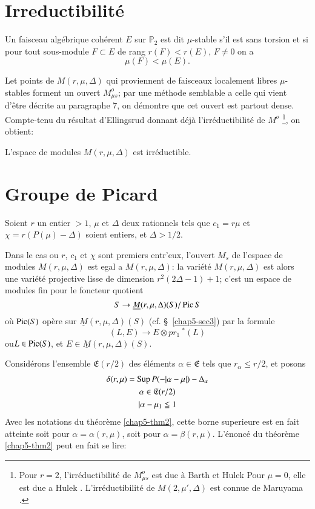 \section{Irreductibilit\'e}\label{chap5-sec8}

Un faisceau alg\'ebrique coh\'erent $E$ sur $\mathbb{P}_{2}$ est dit
$\mu$-stable s'il est sans torsion et si pour tout sous-module
$F\subset E$ de rang $r(F)<r(E)$, $F\neq 0$ on a 
$$
\mu(F)<\mu(E).
$$\pageoriginale

Let points de $M(r,\mu,\Delta)$ qui proviennent de faisceaux
localement libres $\mu$-stables forment un ouvert $M^{o}_{\mu s}$; par
une m\'ethode semblable a celle qui vient d'\^etre d\'ecrite au
paragraphe 7, on d\'emontre que cet ouvert est partout
dense. Compte-tenu du r\'esultat d'Ellingsrud donnant d\'ej\`a
l'irr\'eductibilit\'e de $M^{o}$ \cite{chap5-key6}\footnote[1]{Pour
$r=2$, l'irr\'eductibilit\'e de $M^{o}_{\mu s}$ est due \`a
Barth \cite{chap5-key2} et Hulek \cite{chap5-key9} Pour $\mu=0$, elle
est due a Hulek \cite{chap5-key10}. L'irr\'eductibilit\'e de
$M(2,\mu',\Delta)$ est connue de Maruyama \cite{chap5-key12}.}, on
obtient: 

\begin{theorem}\label{chap5-thm4}
L'espace de modules $M(r,\mu,\Delta)$ est irr\'eductible. 
\end{theorem}

\section{Groupe de Picard}\label{chap5-sec9}

Soient $r$ un entier $>1$, $\mu$ et $\Delta$ deux rationnels tels que
$c_{1}=r\mu$ et $\chi=r(P(\mu)-\Delta)$ soient entiers, et
$\Delta>1/2$. 

Dans le cas ou $r$, $c_{1}$ et $\chi$ sont premiers entr'eux, l'ouvert
$M_{s}$ de l'espace de modules $M(r,\mu,\Delta)$ est egal a
$M(r,\mu,\Delta)$: la vari\'et\'e $M(r,\mu,\Delta)$ est alors une
vari\'et\'e projective lisse de dimension $r^{2}(2\Delta-1)+1$; c'est
un espace de modules fin pour le foncteur quotient 
$$
S\to \underline{M}(r,\mu,\Delta)(S)/\operatorname{Pic} S
$$
o\`u $\operatorname{Pic} (S)$ op\`ere sur $\underline{M}(r,\mu,\Delta)(S)$
(cf. \S\ \ref{chap5-sec3}) par la formule
$$
(L,E)\to E\otimes pr_{1} \ {}^{*}(L) 
$$
ou\pageoriginale $L\in \operatorname{Pic}(S)$, et
$E\in \underline{M}(r,\mu,\Delta)(S)$. 

Consid\'erons l'ensemble $\mathfrak{E}(r/2)$ des \'el\'ements
$\alpha\in \mathfrak{E}$ tels que $r_{\alpha}\leq r/2$, et posons
\begin{gather*}
\delta(r,\mu)=\operatorname{Sup} P(-|\alpha-\mu|)-\Delta_{\alpha}\\
\alpha\in \mathfrak{E}(r/2)\\
|\alpha-\mu_{1}\leqq 1
\end{gather*}
Avec les notations du th\'eor\`eme \ref{chap5-thm2}, cette borne
superieure est en fait atteinte soit pour $\alpha=\alpha(r,\mu)$, soit
pour $\alpha=\beta(r,\mu)$. L'\'enonc\'e du
th\'eor\`eme \ref{chap5-thm2} peut en fait se lire:

